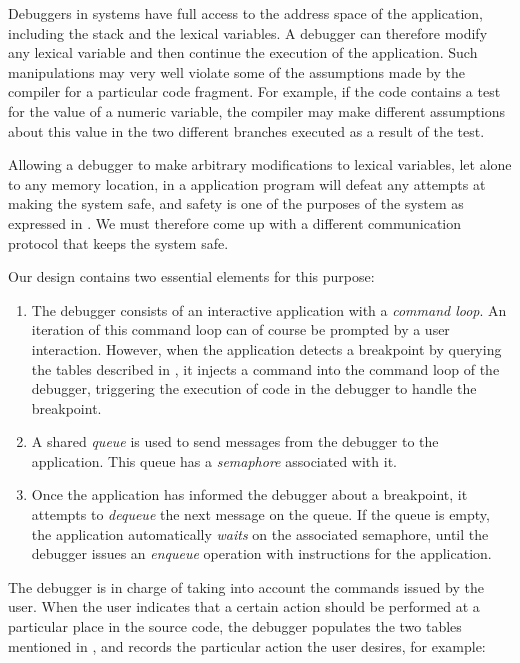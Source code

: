 Debuggers in \unix{} systems have full access to the address space of
the application, including the stack and the lexical variables.  A
\unix{} debugger can therefore modify any lexical variable and then
continue the execution of the application.  Such manipulations may
very well violate some of the assumptions made by the compiler for a
particular code fragment.  For example, if the code contains a test
for the value of a numeric variable, the compiler may make different
assumptions about this value in the two different branches executed as
a result of the test.

Allowing a debugger to make arbitrary modifications to lexical
variables, let alone to any memory location, in a \commonlisp{}
application program will defeat any attempts at making the system
safe, and safety is one of the purposes of the \sicl{} system as
expressed in .  We must therefore come up
with a different communication protocol that keeps the system safe.

Our design contains two essential elements for this purpose:

\begin{enumerate}
\item The debugger consists of an interactive application with a
  \emph{command loop}.  An iteration of this command loop can of
  course be prompted by a user interaction.  However, when the
  application detects a breakpoint by querying the tables described in
  , it injects a command into the
  command loop of the debugger, triggering the execution of code in
  the debugger to handle the breakpoint.
\item A shared \emph{queue} is used to send messages from the debugger
  to the application.  This queue has a \emph{semaphore} associated
  with it.
\item Once the application has informed the debugger about a
  breakpoint, it attempts to \emph{dequeue} the next message on the
  queue.  If the queue is empty, the application automatically
  \emph{waits} on the associated semaphore, until the debugger issues
  an \emph{enqueue} operation with instructions for the application.
\end{enumerate}

The debugger is in charge of taking into account the commands issued
by the user.  When the user indicates that a certain action should be
performed at a particular place in the source code, the debugger
populates the two tables mentioned in ,
and records the particular action the user desires, for example:

